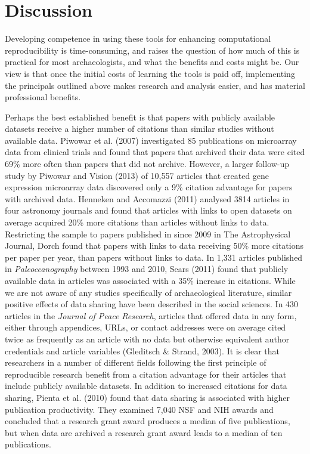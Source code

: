 \documentclass[american,man]{apa6}
\newcounter{author}
\begin{document}
\section{Discussion}\label{discussion}

Developing competence in using these tools for enhancing computational
reproducibility is time-consuming, and raises the question of how much
of this is practical for most archaeologists, and what the benefits and
costs might be. Our view is that once the initial costs of learning the
tools is paid off, implementing the principals outlined above makes
research and analysis easier, and has material professional benefits.

Perhaps the best established benefit is that papers with publicly
available datasets receive a higher number of citations than similar
studies without available data. Piwowar et al. (2007) investigated 85
publications on microarray data from clinical trials and found that
papers that archived their data were cited 69\% more often than papers
that did not archive. However, a larger follow-up study by Piwowar and
Vision (2013) of 10,557 articles that created gene expression microarray
data discovered only a 9\% citation advantage for papers with archived
data. Henneken and Accomazzi (2011) analysed 3814 articles in four
astronomy journals and found that articles with links to open datasets
on average acquired 20\% more citations than articles without links to
data. Restricting the sample to papers published in since 2009 in The
Astrophysical Journal, Dorch found that papers with links to data
receiving 50\% more citations per paper per year, than papers without
links to data. In 1,331 articles published in \emph{Paleoceanography}
between 1993 and 2010, Sears (2011) found that publicly available data
in articles was associated with a 35\% increase in citations. While we
are not aware of any studies specifically of archaeological literature,
similar positive effects of data sharing have been described in the
social sciences. In 430 articles in the \emph{Journal of Peace
Research}, articles that offered data in any form, either through
appendices, URLs, or contact addresses were on average cited twice as
frequently as an article with no data but otherwise equivalent author
credentials and article variables (Gleditsch \& Strand, 2003). It is
clear that researchers in a number of different fields following the
first principle of reproducible research benefit from a citation
advantage for their articles that include publicly available datasets.
In addition to increased citations for data sharing, Pienta et al.
(2010) found that data sharing is associated with higher publication
productivity. They examined 7,040 NSF and NIH awards and concluded that
a research grant award produces a median of five publications, but when
data are archived a research grant award leads to a median of ten
publications.
\end{document}
